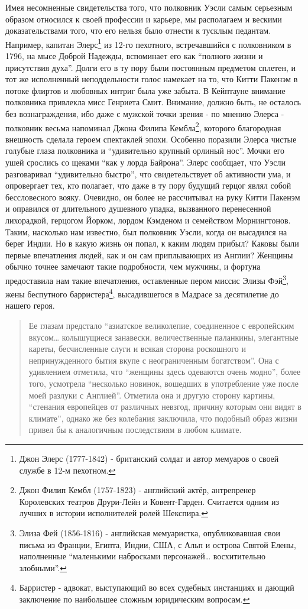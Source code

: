 \documentclass[
  oneside,
  12pt,
  titlepage]{book}
\begin{document}
Имея несомненные свидетельства того, что полковник Уэсли самым серьезным образом относился к своей профессии и карьере, мы располагаем и вескими доказательствами того, что его нельзя было отнести к тусклым педантам. Например, капитан Элерс\footnote{Джон Элерс (1777-1842) - британский солдат и автор мемуаров о своей службе в 12-м пехотном.} из 12-го пехотного, встречавшийся с полковником в 1796, на мысе Доброй Надежды, вспоминает его как ``полного жизни и присутствия духа''. Долги его в ту пору были постоянным предметом сплетен, и тот же исполненный неподдельности голос намекает на то, что Китти Пакенэм в потоке флиртов и любовных интриг была уже забыта. В Кейптауне внимание полковника привлекла мисс Генриета Смит. Внимание, должно быть, не осталось без вознаграждения, ибо даже с мужской точки зрения - по мнению Элерса - полковник весьма напоминал Джона Филипа Кембла\footnote{Джон Филип Кембл (1757-1823) - английский актёр, антрепренер Королевских театров Друри-Лейн и Ковент-Гарден. Считается одним из лучших в истории исполнителей ролей Шекспира.}, которого благородная внешность сделала героем спектаклей эпохи. Особенно поразили Элерса чистые голубые глаза полковника и ``удивительно крупный орлиный нос''. Мочки его ушей срослись со щеками ``как у лорда Байрона''. Элерс сообщает, что Уэсли разговаривал ``удивительно быстро'', что свидетельствует об активности ума, и опровергает тех, кто полагает, что даже в ту пору будущий герцог являл собой бессловесного вояку. Очевидно, он более не рассчитывал на руку Китти Пакенэм и оправился от длительного душевного упадка, вызванного перенесенной лихорадкой, герцогом Йорком, лордом Кэмденом и семейством Морнингтонов. Таким, насколько нам известно, был полковник Уэсли, когда он высадился на берег Индии. Но в какую жизнь он попал, к каким людям прибыл? Каковы были первые впечатления людей, как и он сам приплывающих из Англии? Женщины обычно точнее замечают такие подробности, чем мужчины, и фортуна предоставила нам такие впечатления, оставленные пером миссис Элизы Фэй\footnote{Элиза Фей (1856-1816) - английская мемуаристка, опубликовавшая свои письма из Франции, Египта, Индии, США, с Альп и острова Святой Елены, наполненные ``маленькими набросками персонажей\ldots{} восхитительно злобными''.}, жены беспутного барристера\footnote{Барристер - адвокат, выступающий во всех судебных инстанциях и дающий заключение по наибольшее сложным юридическим вопросам.}, высадившегося в Мадрасе за десятилетие до нашего героя.

\begin{quote}
Ее глазам предстало ``азиатское великолепие, соединенное с европейским вкусом\ldots{} колышущиеся занавески, величественные паланкины, элегантные кареты, бесчисленные слуги и всякая сторона роскошного и непринужденного бытия вкупе с неограниченным богатством''. Она с удивлением отметила, что ``женщины здесь одеваются очень модно'', более того, усмотрела ``несколько новинок, вошедших в употребление уже после моей разлуки с Англией''. Отметила она и другую сторону картины, ``стенания европейцев от различных невзгод, причину которым они видят в климате'', однако же без колебания заключила, что подобный образ жизни привел бы к аналогичным последствиям в любом климате.
\end{quote}
\end{document}
